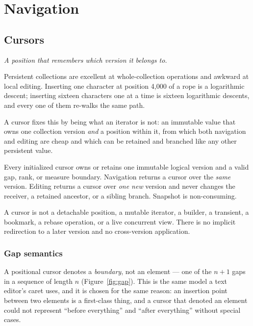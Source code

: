 \documentclass[11pt,twoside,openright]{book}
\newcommand{\motto}[1]{%
  \begingroup
  \vspace{-4pt}\hfill\begin{minipage}{0.80\textwidth}
    \raggedleft\itshape\color{d7slate}\small #1\par
  \end{minipage}\par\vspace{18pt}
  \endgroup}
\begin{document}
\part{Navigation}
\label{part:navigation}

\chapter{Cursors}
\label{ch:cursors}

\motto{A position that remembers which version it belongs to.}

\noindent
Persistent collections are excellent at whole-collection operations and
awkward at local editing. Inserting one character at position 4{,}000 of a rope
is a logarithmic descent; inserting sixteen characters one at a time is sixteen
logarithmic descents, and every one of them re-walks the same path.

A cursor fixes this by being what an iterator is not: an immutable value that
owns one collection version \emph{and} a position within it, from which both
navigation and editing are cheap and which can be retained and branched like any
other persistent value.

\begin{contractbox}
Every initialized cursor owns or retains one immutable logical version and a
valid gap, rank, or measure boundary. Navigation returns a cursor over the
\emph{same} version. Editing returns a cursor over \emph{one new} version and
never changes the receiver, a retained ancestor, or a sibling branch. Snapshot
is non-consuming.

A cursor is not a detachable position, a mutable iterator, a builder, a
transient, a bookmark, a rebase operation, or a live concurrent view. There is
no implicit redirection to a later version and no cross-version application.
\end{contractbox}

\section{Gap semantics}

A positional cursor denotes a \emph{boundary}, not an element --- one of the
$n+1$ gaps in a sequence of length $n$ (Figure~\ref{fig:gap}). This is the same
model a text editor's caret uses, and it is chosen for the same reason: an
insertion point between two elements is a first-class thing, and a cursor that
denoted an element could not represent ``before everything'' and ``after
everything'' without special cases.
\end{document}
